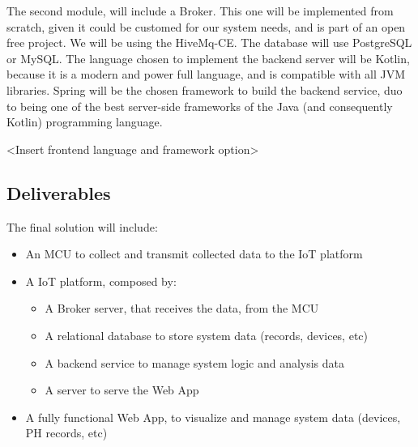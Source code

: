 \documentclass[a4paper,twoside,11pt]{article}
\begin{document}
The second module, will include a Broker. This one will be implemented from scratch, given it could be customed for our system needs, and is part of an open free project. We will be using the HiveMq-CE.
The database will use PostgreSQL or MySQL.
The language chosen to implement the backend server will be Kotlin, because it is a modern and power full language, and is compatible with all JVM libraries.
Spring will be the chosen framework to build the backend service, duo to being one of the best server-side frameworks of the Java (and consequently Kotlin) programming language.

<Insert frontend language and framework option>

\subsection{Deliverables}
The final solution will include:
\begin{itemize}
    \item An MCU to collect and transmit collected data to the IoT platform
    \item A IoT platform, composed by:
    \begin{itemize}
        \item A Broker server, that receives the data, from the MCU
        \item A relational database to store system data (records, devices, etc) 
        \item A backend service to manage system logic and analysis data
        \item A server to serve the Web App
        \end{itemize}
        \item A fully functional Web App, to visualize and manage system data (devices, PH records, etc)
\end{itemize}



\end{document}
